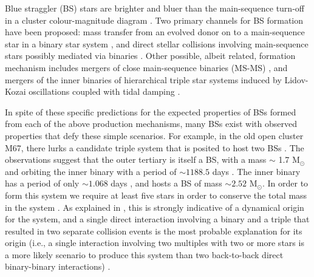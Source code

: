 \documentclass{aastex62}
\begin{document}
Blue straggler (BS) stars are brighter and bluer than the
main-sequence turn-off in a cluster colour-magnitude diagram
\citep[e.g.][]{1953AJ.....58...61S,2014ApJ...782...49S}.  Two
primary channels for BS formation have been proposed: mass transfer
from an evolved donor on to a main-sequence star in a binary star
system
\citep[e.g.][]{1964MNRAS.128..147M,1997A&A...328..143P,2009Natur.457..288K,2011MNRAS.410.2370L,2011Natur.478..356G},
and direct stellar collisions involving main-sequence stars possibly
mediated via binaries
\citep[e.g.][]{hills75,1997A&A...328..130P,2007ApJ...661..210L,2013MNRAS.428..897L,2013MNRAS.429.1221H,2018arXiv181100058P}.
Other possible, albeit related, formation mechanism includes mergers
of close main-sequence binaries (MS-MS) \cite{2018arXiv181100058P},
and mergers of the inner binaries of hierarchical triple star systems
induced by Lidov-Kozai oscillations coupled with tidal damping
\citep[e.g.][]{2009ApJ...697.1048P}.

In spite of these specific predictions for the expected properties of
BSs formed from each of the above production mechanisms, many BSs
exist with observed properties that defy these simple scenarios.  For
example, in the old open cluster M67, there lurks a candidate triple
system that is posited to host two BSs
\citep{2001A&A...375..375V,2003AJ....125..810S}.  The observations
suggest that the outer tertiary is itself a BS, with a mass $\sim$ 1.7
M$_{\odot}$ and orbiting the inner binary with a period of $\sim
1188.5$ days \citep{2003AJ....125..810S}.  The inner binary has a
period of only $\sim 1.068$ days \citep{2001A&A...375..375V}, and
hosts a BS of mass $\sim 2.52$ M$_{\odot}$.  In order to form this
system we require at least five stars in order to conserve the total
mass in the system \citep{2011MNRAS.410.2370L}.  As explained in
\citet{2011MNRAS.410.2370L}, this is strongly indicative of a
dynamical origin for the system, and a single direct interaction
involving a binary and a triple that resulted in two separate
collision events is the most probable explanation for its origin
(i.e., a single interaction involving two multiples with two or more
stars is a more likely scenario to produce this system than two
back-to-back direct binary-binary interactions)
\citep{2004MNRAS.350..615G}.  
\end{document}
